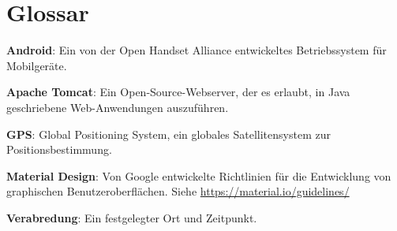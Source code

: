 \documentclass[parskip=full,11pt]{scrartcl}
\begin{document}
\pagebreak
\section{Glossar}

\textbf{Android}:
Ein von der Open Handset Alliance entwickeltes Betriebssystem für Mobilgeräte.

\textbf{Apache Tomcat}:
Ein Open-Source-Webserver, der es erlaubt, in Java geschriebene Web-Anwendungen
auszuführen.

\textbf{GPS}:
Global Positioning System, ein globales Satellitensystem zur
Positionsbestimmung.

\textbf{Material Design}:
Von Google entwickelte Richtlinien für die Entwicklung von graphischen
Benutzeroberflächen.
Siehe \url{https://material.io/guidelines/}

\textbf{Verabredung}:
Ein festgelegter Ort und Zeitpunkt.
\end{document}
